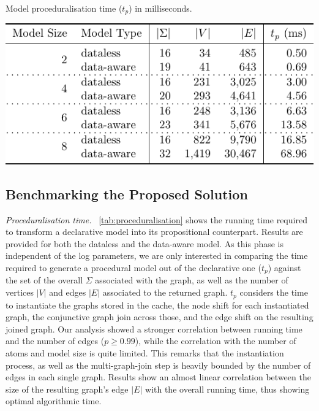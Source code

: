 \documentclass[sigconf]{acmart}
\begin{document}
\begin{table}[!t]
\centering
\caption{Model proceduralisation time ($t_p$) in milliseconds.}\label{tab:proceduralisation}
\includegraphics[scale=.7]{fig/tabmod}
\end{table}
\subsection{Benchmarking the Proposed Solution}\label{ssec:proposed}


\textit{Proceduralisation time.} \tablename~\ref{tab:proceduralisation} shows the running time required to transform a declarative model into its propositional counterpart. Results are provided for both the dataless and the data-aware model. As this phase is independent of the log parameters, we are only interested in comparing the time required to generate a procedural model out of the declarative one ($t_p$) against the set of the overall $\Sigma$ associated with the graph, as well as the number of vertices $|V|$ and edges $|E|$ associated to the returned graph. $t_p$ considers the time to instantiate the graphs stored in the cache,  the node shift for each instantiated graph,  the conjunctive graph join across those, and the edge shift on the resulting joined graph. Our analysis showed a stronger correlation between running time and the number of edges ($p\geq 0.99$), while the correlation with the number of atoms and model size is quite limited. This remarks that the instantiation process, as well as the multi-graph-join step is heavily bounded by the number of edges in each single graph. Results show an almost linear correlation between the size of the resulting graph's edge $|E|$ with the overall running time, thus showing optimal algorithmic time.\medskip
\end{document}
